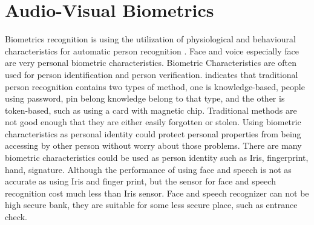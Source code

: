 \section{Audio-Visual Biometrics}
Biometrics recognition is using the utilization of physiological and behavioural characteristics for automatic person recognition \cite{aleksic2006audio}. Face and voice especially face are very personal biometric characteristics. Biometric Characteristics are often used for person identification and person verification. \cite{aleksic2006audio} indicates that traditional person recognition contains two types of method, one is knowledge-based, people using password, pin belong knowledge belong to that type, and the other is token-based, such as using a card with magnetic chip. Traditional methods are not good enough that they are either easily forgotten or stolen. Using biometric characteristics as personal identity could protect personal properties from being accessing by other person without worry about those problems. There are many biometric characteristics could be used as person identity such as Iris, fingerprint, hand, signature. Although the performance of using face and speech is not as accurate as using Iris and finger print, but the sensor for face and speech recognition cost much less than Iris sensor. Face and speech recognizer can not be high secure bank, they are suitable for some less secure place, such as entrance check.